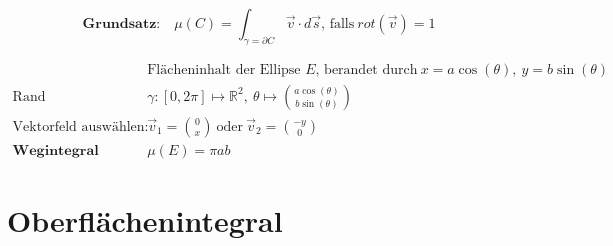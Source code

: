 \documentclass[11pt]{article}
\begin{document}
\begin{equation*}
	\textbf{Grundsatz:}\quad \mu(C) = \int_{\gamma = \partial C} \vec{v} \cdot d\vec{s}\text{, falls}\ rot(\vec{v}) = 1
\end{equation*}

\begin{equation*}
\begin{split}
	& \text{Fl{\"a}cheninhalt der Ellipse $E$, berandet durch}\ x = a\cos(\theta),\ y = b\sin(\theta) \\
	\text{Rand parametrisieren:}\quad & \gamma: [0, 2\pi] \mapsto \mathbb{R}^2,\ \theta \mapsto \binom{a\cos(\theta)}{b\sin(\theta)} \\
	\text{Vektorfeld ausw{\"a}hlen:}\quad & \vec{v}_1 = \binom{0}{x}\ \text{oder}\ \vec{v}_2 = \binom{-y}{0} \\
	\textbf{Wegintegral ausrechnen:}\quad & \mu(E) = \pi ab
\end{split}
\end{equation*}

\section{Oberfl{\"a}chenintegral}
\end{document}
